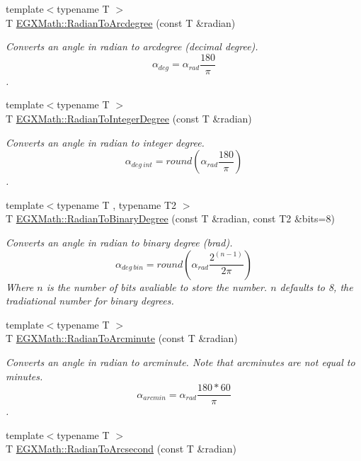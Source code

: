 \begin{DoxyCompactItemize}
{\footnotesize template$<$typename T $>$ }\\T \mbox{\hyperlink{group___e_g_x_math-_angle_conversions-_radian_ga3dfdc97357cc07f8379976bbc08f9852}{E\+G\+X\+Math\+::\+Radian\+To\+Arcdegree}} (const T \&radian)
\begin{DoxyCompactList}\small\item\em Converts an angle in radian to arcdegree (decimal degree). \[\alpha_{deg}=\alpha_{rad}\frac{180}{\pi}\]. \end{DoxyCompactList}\item 
{\footnotesize template$<$typename T $>$ }\\T \mbox{\hyperlink{group___e_g_x_math-_angle_conversions-_radian_gac84796dfdeb56235e1e338522a5f9350}{E\+G\+X\+Math\+::\+Radian\+To\+Integer\+Degree}} (const T \&radian)
\begin{DoxyCompactList}\small\item\em Converts an angle in radian to integer degree. \[\alpha_{deg\ int}=round(\alpha_{rad}\frac{180}{\pi})\]. \end{DoxyCompactList}\item 
{\footnotesize template$<$typename T , typename T2 $>$ }\\T \mbox{\hyperlink{group___e_g_x_math-_angle_conversions-_radian_ga13311d9b6977d514f1d6c336e7c0162b}{E\+G\+X\+Math\+::\+Radian\+To\+Binary\+Degree}} (const T \&radian, const T2 \&bits=8)
\begin{DoxyCompactList}\small\item\em Converts an angle in radian to binary degree (brad). \[\alpha_{deg\ bin}=round(\alpha_{rad}\frac{2^{(n-1)}}{2 \pi})\] Where $n$ is the number of bits avaliable to store the number. $n$ defaults to 8, the tradiational number for binary degrees. \end{DoxyCompactList}\item 
{\footnotesize template$<$typename T $>$ }\\T \mbox{\hyperlink{group___e_g_x_math-_angle_conversions-_radian_ga722e3b8e78540a6b3942b73b64aeb8d2}{E\+G\+X\+Math\+::\+Radian\+To\+Arcminute}} (const T \&radian)
\begin{DoxyCompactList}\small\item\em Converts an angle in radian to arcminute. Note that arcminutes are not equal to minutes. \[\alpha_{arcmin}=\alpha_{rad}\frac{180 * 60}{\pi}\]. \end{DoxyCompactList}\item 
{\footnotesize template$<$typename T $>$ }\\T \mbox{\hyperlink{group___e_g_x_math-_angle_conversions-_radian_ga2f952f6675a0fc54bf72bfe4e3d2664a}{E\+G\+X\+Math\+::\+Radian\+To\+Arcsecond}} (const T \&radian)

\end{DoxyCompactItemize}
